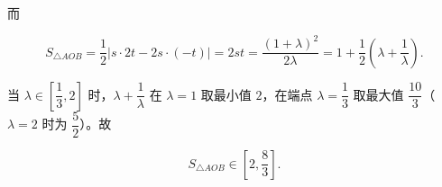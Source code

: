 \begin{answer}
而

\nopagebreak[4]
\[S_{\triangle AOB}=\frac12|s\cdot2t-2s\cdot(-t)|=2st
=\frac{(1+\lambda)^2}{2\lambda}
=1+\frac12\left(\lambda+\frac1\lambda\right).\]

当 $\lambda\in\left[\dfrac13,2\right]$ 时，$\lambda+\dfrac1\lambda$ 在 $\lambda=1$ 取最小值 $2$，在端点 $\lambda=\dfrac13$ 取最大值 $\dfrac{10}3$（$\lambda=2$ 时为 $\dfrac52$）。故

\nopagebreak[4]
\[S_{\triangle AOB}\in\left[2,\frac83\right].\]


\end{answer}